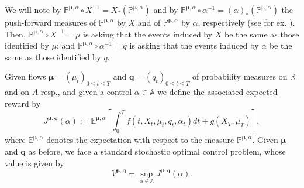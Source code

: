 \documentclass[11pt]{article}
\theoremstyle{definition}
\begin{document}
We will note by $\mathbb{P}^{\bm{\mu}, \alpha} \circ X^{-1}=X_{*}(\mathbb{P}^{\bm{\mu}, \alpha})$ and by $\mathbb{P}^{\bm{\mu}, \alpha} \circ \alpha^{-1}=(\alpha)_{*}(\mathbb{P}^{\bm{\mu}, \alpha})$ the push-forward measures of $\mathbb{P}^{\bm{\mu}, \alpha}$ by $X$ and of $\mathbb{P}^{\bm{\mu}, \alpha}$ by $\alpha$, respectively (see for ex. \citep{bogachev2005measuretheory}). Then, $\mathbb{P}^{\bm{\mu}, \alpha} \circ X^{-1} = \mu$ is asking that the events induced by $X$ be the same as those identified by $\mu$; and $\mathbb{P}^{\bm{\mu}, \alpha} \circ \alpha^{-1} = q$ is asking that the events induced by $\alpha$ be the same as those identified by $q$.


Given flows $\bm{\mu}=(\mu_t)_{0\leq t\leq T}$ and $\bm{q}=(q_t)_{0\leq t\leq T}$ of probability measures on $\mathbb{R}$ and on $A$ resp., and given a control $\alpha \in \mathbb{A}$ we define the associated expected reward by
$$ J^{\bm{\mu}, \bm{q}}(\alpha) := \mathbb{E}^{\bm{\mu}, \alpha}\left[\int_0^T f(t, X_t, \mu_t, q_t, \alpha_t) dt + g(X_T, \mu_T) \right], $$
where $\mathbb{E}^{\bm{\mu}, \alpha}$ denotes the expectation with respect to the measure $\mathbb{P}^{\bm{\mu}, \alpha}$. Given $\bm{\mu}$ and $\bm{q}$ as before, we face a standard stochastic optimal control problem, whose value is given by
$$ V^{\bm{\mu}, \bm{q}} = \sup_{\alpha \in \mathbb{A}} J^{\bm{\mu}, \bm{q}}(\alpha). $$
\end{document}
